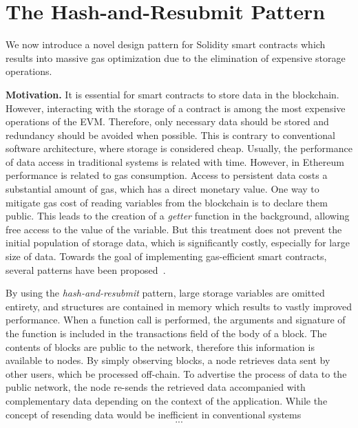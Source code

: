 \section{The Hash-and-Resubmit Pattern}

We now introduce a novel design pattern for Solidity smart contracts which
results into massive gas optimization due to the elimination of expensive
storage operations.

\textbf{Motivation.}
It is essential for smart contracts to store data in the blockchain. However,
interacting with the storage of a contract is among the most expensive
operations of the EVM. Therefore, only necessary data should be stored and
redundancy should be avoided when possible. This is contrary to conventional
software architecture, where storage is considered cheap. Usually, the
performance of data access in traditional systems is related with time.
However, in Ethereum performance is related to gas consumption. Access to
persistent data costs a substantial amount of gas, which has a direct monetary
value. One way to mitigate gas cost of reading variables from the blockchain is
to declare them public.  This leads to the creation of a \emph{getter} function
in the background, allowing free access to the value of the variable. But this
treatment does not prevent the initial population of storage data, which is
significantly costly, especially for large size of data. Towards the goal of
implementing gas-efficient smart contracts, several patterns have been
proposed~\cite{contract-opt-1, contract-opt-2, contract-opt-3}.

By using the \emph{hash-and-resubmit} pattern, large storage variables are
omitted entirety, and structures are contained in memory which results to
vastly improved performance. When a function call is performed, the arguments
and signature of the function is included in the transactions field of the body
of a block. The contents of blocks are public to the network, therefore this
information is available to nodes. By simply observing blocks, a node retrieves
data sent by other users, which be processed off-chain. To advertise the
process of data to the public network, the node re-sends the retrieved data
accompanied with complementary data depending on the context of the
application. While the concept of resending data would be inefficient in
conventional systems \[...\]

